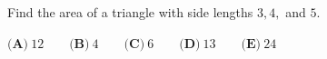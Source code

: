 Find the area of a triangle with side lengths $3,4,$ and $5$.

$\textbf{(A)}~12\qquad\textbf{(B)}~4\qquad\textbf{(C)}~6\qquad\textbf{(D)}~13\qquad\textbf{(E)}~24\qquad$
